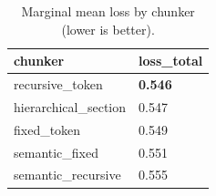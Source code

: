 \begin{table}[t]
\centering
\small
\begin{tabular}{l l}
\toprule
chunker & loss_total \\
\midrule
recursive_token & \textbf{0.546} \\
hierarchical_section & 0.547 \\
fixed_token & 0.549 \\
semantic_fixed & 0.551 \\
semantic_recursive & 0.555 \\
\bottomrule
\end{tabular}
\caption{Marginal mean loss by chunker (lower is better).}
\label{tab:marginal_chunker}
\end{table}